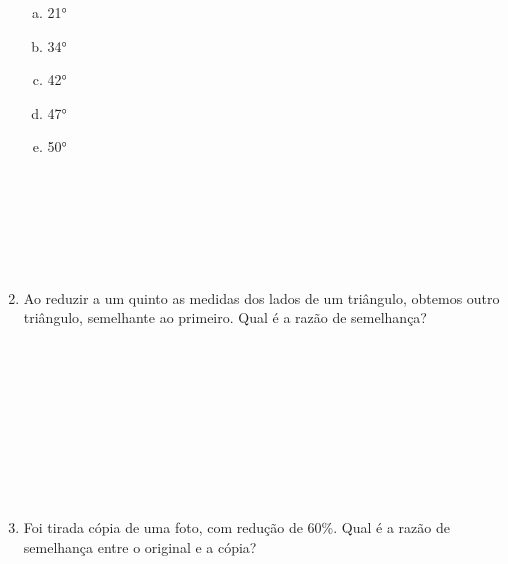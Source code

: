 \documentclass[a4paper,14pt]{article}
\begin{document}
\begin{multicols}{2}
\begin{enumerate}
			\begin{enumerate}[a)]
				\item 21°
				\item 34°
				\item 42°
				\item 47°
				\item 50° \\\\\\\\\\\\\\
			\end{enumerate}
			\item Ao reduzir a um quinto as medidas dos lados de um triângulo, obtemos outro triângulo, semelhante ao primeiro. Qual é a razão de semelhança? \\\\\\\\\\\\\\\\\\\\
			\item Foi tirada cópia de uma foto, com redução de 60\%. Qual é a razão de semelhança entre o original e a cópia? \\\\\\\\\\\\\\\\\\\\
		\end{enumerate}
			 $~$ \\ $~$ \\ $~$ \\ $~$ \\ $~$ \\ $~$ \\ $~$ \\ $~$ \\ $~$ \\ $~$ \\ $~$ \\
	\end{multicols}
\end{document}

